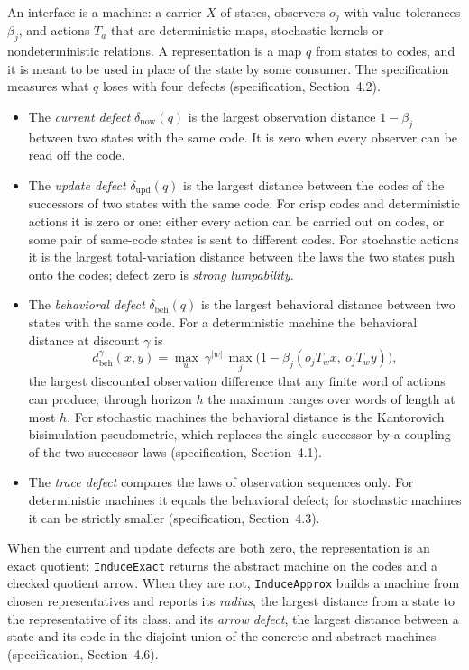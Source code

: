 \documentclass[11pt]{article}
\newcommand{\code}[1]{\texttt{#1}}
\newcommand{\dnow}{\delta_{\mathrm{now}}}
\newcommand{\dupd}{\delta_{\mathrm{upd}}}
\newcommand{\dbd}{\delta_{\mathrm{beh}}}
\newcommand{\dbeh}{d_{\mathrm{beh}}}
\newcommand{\spec}[1]{specification, Section~#1}
\theoremstyle{definition}
\theoremstyle{plain}
\begin{document}
An interface is a machine: a carrier $X$ of states, observers $o_j$ with value tolerances
$\beta_j$, and actions $T_a$ that are deterministic maps, stochastic kernels or nondeterministic
relations. A representation is a map $q$ from states to codes, and it is meant to be used in place
of the state by some consumer. The specification measures what $q$ loses with four defects
(\spec{4.2}).
\begin{itemize}
\item The \emph{current defect} $\dnow(q)$ is the largest observation distance $1-\beta_j$ between
two states with the same code. It is zero when every observer can be read off the code.
\item The \emph{update defect} $\dupd(q)$ is the largest distance between the codes of the
successors of two states with the same code. For crisp codes and deterministic actions it is zero
or one: either every action can be carried out on codes, or some pair of same-code states is sent
to different codes. For stochastic actions it is the largest total-variation distance between
the laws the two states push onto the codes; defect zero is \emph{strong lumpability}.
\item The \emph{behavioral defect} $\dbd(q)$ is the largest behavioral distance between two
states with the same code. For a deterministic machine the behavioral distance at discount
$\gamma$ is
\[
\dbeh^\gamma(x,y)=\max_{w}\ \gamma^{|w|}\,\max_j\bigl(1-\beta_j(o_jT_wx,\ o_jT_wy)\bigr),
\]
the largest discounted observation difference that any finite word of actions can produce; through
horizon $h$ the maximum ranges over words of length at most $h$. For stochastic machines the
behavioral distance is the Kantorovich bisimulation pseudometric, which replaces the single
successor by a coupling of the two successor laws (\spec{4.1}).
\item The \emph{trace defect} compares the laws of observation sequences only. For deterministic
machines it equals the behavioral defect; for stochastic machines it can be strictly smaller
(\spec{4.3}).
\end{itemize}
When the current and update defects are both zero, the representation is an exact quotient:
\code{InduceExact} returns the abstract machine on the codes and a checked quotient arrow. When they
are not, \code{InduceApprox} builds a machine from chosen representatives and reports its
\emph{radius}, the largest distance from a state to the representative of its class, and its
\emph{arrow defect}, the largest distance between a state and its code in the disjoint union of
the concrete and abstract machines (\spec{4.6}).
\end{document}
